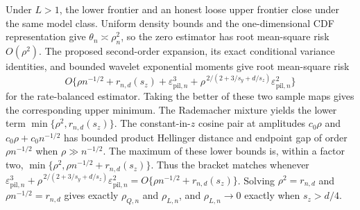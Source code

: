 Under \(L>1\), the lower frontier and an honest loose upper frontier close under the same model class.  Uniform density bounds and the one-dimensional CDF representation give \(\theta_n\asymp\rho_n^2\), so the zero estimator has root mean-square risk \(O(\rho^2)\).  The proposed second-order expansion, its exact conditional variance identities, and bounded wavelet exponential moments give root mean-square risk
\[
 O\{\rho n^{-1/2}+r_{n,d}(s_z)+
 \varepsilon_{\mathrm{pil},n}^3+
 \rho^{\,2/(2+3/s_y+d/s_z)}\varepsilon_{\mathrm{pil},n}^2\}
\]
for the rate-balanced estimator.  Taking the better of these two sample maps gives the corresponding upper minimum.  The Rademacher mixture yields the lower term \(\min\{\rho^2,r_{n,d}(s_z)\}\).  The constant-in-\(z\) cosine pair at amplitudes \(c_0\rho\) and \(c_0\rho+c_0n^{-1/2}\) has bounded product Hellinger distance and endpoint gap of order \(\rho n^{-1/2}\) when \(\rho\gg n^{-1/2}\).  The maximum of these lower bounds is, within a factor two, \(\min\{\rho^2,\rho n^{-1/2}+r_{n,d}(s_z)\}\).  Thus the bracket matches whenever \(\varepsilon_{\mathrm{pil},n}^3+\rho^{\,2/(2+3/s_y+d/s_z)}\varepsilon_{\mathrm{pil},n}^2=O\{\rho n^{-1/2}+r_{n,d}(s_z)\}\).  Solving \(\rho^2=r_{n,d}\) and \(\rho n^{-1/2}=r_{n,d}\) gives exactly \(\rho_{Q,n}\) and \(\rho_{L,n}\), and \(\rho_{L,n}\to0\) exactly when \(s_z>d/4\).
